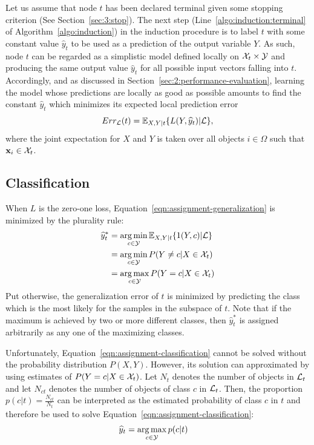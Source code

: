 Let us assume that node $t$ has been declared terminal given some stopping
criterion (See Section~\ref{sec:3:stop}). The next step
(Line~\ref{algo:induction:terminal} of Algorithm~\ref{algo:induction}) in the
induction procedure is to label $t$ with some constant value $\widehat{y}_t$ to
be used as a prediction of the output variable $Y$. As such, node $t$ can  be
regarded as a simplistic model defined locally on ${\cal X}_t \times {\cal Y}$
and producing the same output value $\widehat{y}_t$ for all possible input
vectors falling into $t$. Accordingly, and as discussed in
Section~\ref{sec:2:performance-evaluation}, learning the model whose predictions are locally as
good as possible  amounts to find the constant $\widehat{y}_t$ which minimizes
its expected local prediction error
\begin{equation}\label{eqn:assignment-generalization}
Err_{{\cal L}}(t) = \mathbb{E}_{X, Y|t}\{ L(Y, \widehat{y}_t) | {\cal L} \},
\end{equation}
where the joint expectation for $X$ and $Y$ is taken over all objects $i \in
\Omega$ such that $\mathbf{x}_i \in {\cal X}_t$.

\subsection{Classification}

When $L$ is the zero-one loss, Equation~\ref{eqn:assignment-generalization}
is minimized by the plurality rule:
\begin{align}
\widehat{y}_t^* &= \operatorname*{arg\,min}_{c \in {\cal Y}} \mathbb{E}_{X, Y|t}\{ 1(Y, c) | {\cal L} \} \nonumber \\
                &= \operatorname*{arg\,min}_{c \in {\cal Y}} P(Y \neq c | X \in {\cal X}_t) \nonumber \\
                &= \operatorname*{arg\,max}_{c \in {\cal Y}} P(Y = c | X \in {\cal X}_t)\label{eqn:assignment-classification}
\end{align}
Put otherwise, the generalization error of $t$ is minimized by predicting
the class which is the most likely for the samples in the subspace of $t$.
Note that if the maximum is achieved by two or more different classes, then
$\widehat{y}_t^*$ is assigned arbitrarily as any one of the maximizing classes.

Unfortunately, Equation~\ref{eqn:assignment-classification} cannot be solved
without the probability distribution $P(X, Y)$. However, its solution can
approximated by using estimates of $P(Y=c|X \in {\cal X}_t)$. Let $N_t$ denotes
the number of objects in ${\cal L}_t$ and let $N_{ct}$ denotes the number of
objects of class $c$ in ${\cal L}_t$. Then, the proportion $p(c|t) =
\tfrac{N_{ct}}{N_t}$ can be interpreted as the estimated probability of
class $c$ in $t$ and therefore be used to solve Equation~\ref{eqn:assignment-classification}:
\begin{align}
\widehat{y}_t &= \operatorname*{arg\,max}_{c \in {\cal Y}} p(c | t)
\end{align}






